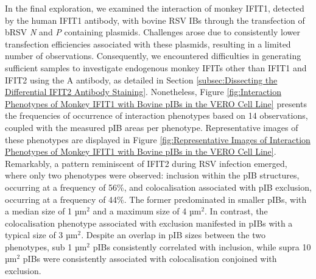 In the final exploration, we examined the interaction of monkey IFIT1, detected by the human IFIT1 antibody, with bovine RSV IBs through the transfection of bRSV \textit{N} and \textit{P} containing plasmids. Challenges arose due to consistently lower transfection efficiencies associated with these plasmids, resulting in a limited number of observations. Consequently, we encountered difficulties in generating sufficient samples to investigate endogenous monkey IFITs other than IFIT1 and IFIT2 using the A antibody, as detailed in Section \ref{subsec:Dissecting the Differential IFIT2 Antibody Staining}. Nonetheless, Figure \ref{fig:Interaction Phenotypes of Monkey IFIT1 with Bovine pIBs in the VERO Cell Line} presents the frequencies of occurrence of interaction phenotypes based on 14 observations, coupled with the measured pIB areas per phenotype. Representative images of these phenotypes are displayed in Figure \ref{fig:Representative Images of Interaction Phenotypes of Monkey IFIT1 with Bovine pIBs in the VERO Cell Line}. Remarkably, a pattern reminiscent of IFIT2 during RSV infection emerged, where only two phenotypes were observed: inclusion within the pIB structures, occurring at a frequency of 56\%, and colocalisation associated with pIB exclusion, occurring at a frequency of 44\%. The former predominated in smaller pIBs, with a median size of 1 \(\mbox{µm}^2\) and a maximum size of 4 \(\mbox{µm}^2\). In contrast, the colocalisation phenotype associated with exclusion manifested in pIBs with a typical size of 3 \(\mbox{µm}^2\). Despite an overlap in pIB sizes between the two phenotypes, sub 1 \(\mbox{µm}^2\) pIBs consistently correlated with inclusion, while supra 10 \(\mbox{µm}^2\) pIBs were consistently associated with colocalisation conjoined with exclusion.

